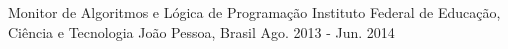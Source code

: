 \begin{cventries}
  \cventry
    {Monitor de Algoritmos e Lógica de Programação} %
    {Instituto Federal de Educação, Ciência e Tecnologia} %
    {João Pessoa, Brasil} %
    {Ago. 2013 - Jun. 2014} %
    {
    }
\end{cventries}
